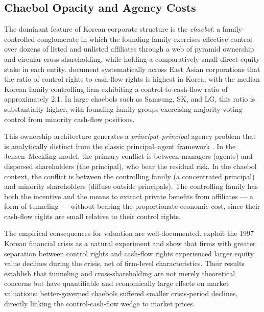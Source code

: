 \documentclass[12pt]{article}
\begin{document}
\subsection{Chaebol Opacity and Agency Costs}

The dominant feature of Korean corporate structure is the \textit{chaebol}: a family-controlled
conglomerate in which the founding family exercises effective control over dozens of listed and
unlisted affiliates through a web of pyramid ownership and circular cross-shareholding, while
holding a comparatively small direct equity stake in each entity. \citet{claessens2000}
document systematically across East Asian corporations that the ratio of control rights to
cash-flow rights is highest in Korea, with the median Korean family controlling firm exhibiting
a control-to-cash-flow ratio of approximately 2:1. In large chaebols such as Samsung, SK, and
LG, this ratio is substantially higher, with founding-family groups exercising majority voting
control from minority cash-flow positions.

This ownership architecture generates a \textit{principal--principal} agency problem that is
analytically distinct from the classic principal--agent framework \citep{jensen1976}. In the
Jensen--Meckling model, the primary conflict is between managers (agents) and dispersed
shareholders (the principal), who bear the residual risk. In the chaebol context, the conflict
is between the controlling family (a concentrated principal) and minority shareholders (diffuse
outside principals). The controlling family has both the incentive and the means to extract
private benefits from affiliates --- a form of tunneling --- without bearing the proportionate
economic cost, since their cash-flow rights are small relative to their control rights.

The empirical consequences for valuation are well-documented. \citet{baek2004} exploit the
1997 Korean financial crisis as a natural experiment and show that firms with greater
separation between control rights and cash-flow rights experienced larger equity value declines
during the crisis, net of firm-level characteristics. Their results establish that tunneling
and cross-shareholding are not merely theoretical concerns but have quantifiable and economically
large effects on market valuations: better-governed chaebols suffered smaller crisis-period
declines, directly linking the control-cash-flow wedge to market prices.
\end{document}
